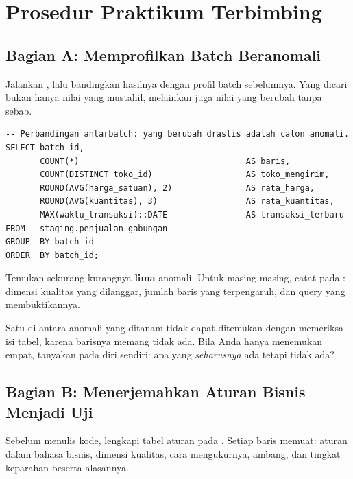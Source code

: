 \section{Prosedur Praktikum Terbimbing}

\subsection{Bagian A: Memprofilkan Batch Beranomali}


Jalankan , lalu bandingkan hasilnya
dengan profil batch sebelumnya. Yang dicari bukan hanya nilai yang mustahil,
melainkan juga nilai yang berubah tanpa sebab.

\begin{lstlisting}[style=sqlgaya]
-- Perbandingan antarbatch: yang berubah drastis adalah calon anomali.
SELECT batch_id,
       COUNT(*)                                  AS baris,
       COUNT(DISTINCT toko_id)                   AS toko_mengirim,
       ROUND(AVG(harga_satuan), 2)               AS rata_harga,
       ROUND(AVG(kuantitas), 3)                  AS rata_kuantitas,
       MAX(waktu_transaksi)::DATE                AS transaksi_terbaru
FROM   staging.penjualan_gabungan
GROUP  BY batch_id
ORDER  BY batch_id;
\end{lstlisting}


Temukan sekurang-kurangnya \textbf{lima} anomali. Untuk masing-masing, catat
pada : dimensi kualitas yang dilanggar, jumlah baris
yang terpengaruh, dan query yang membuktikannya.

\begin{catatan}
Satu di antara anomali yang ditanam tidak dapat ditemukan dengan memeriksa isi
tabel, karena barisnya memang tidak ada. Bila Anda hanya menemukan empat,
tanyakan pada diri sendiri: apa yang \emph{seharusnya} ada tetapi tidak ada?
\end{catatan}

\subsection{Bagian B: Menerjemahkan Aturan Bisnis Menjadi Uji}


Sebelum menulis kode, lengkapi tabel aturan pada
. Setiap baris memuat: aturan dalam bahasa bisnis,
dimensi kualitas, cara mengukurnya, ambang, dan tingkat keparahan beserta
alasannya.

